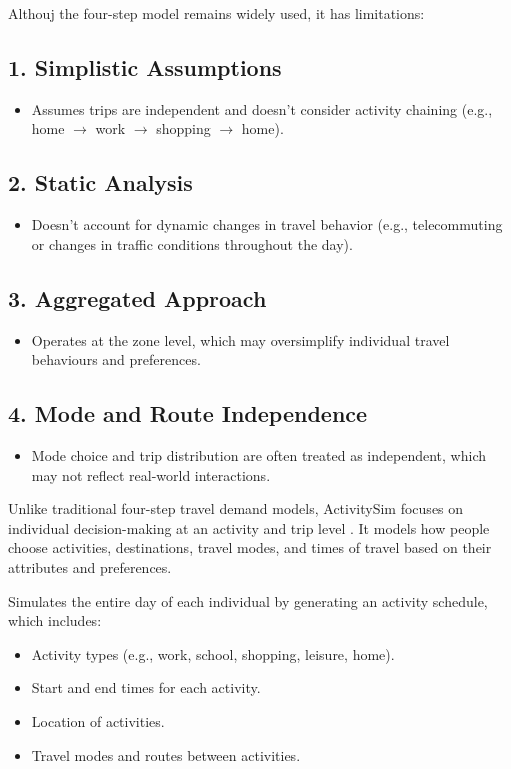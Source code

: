 \documentclass[../main.tex]{subfiles}
\begin{document}
Althouj the four-step model remains widely used, it has limitations:

\subsection*{1. Simplistic Assumptions}
\begin{itemize}
    \item Assumes trips are independent and doesn't consider activity chaining (e.g., home $\rightarrow$ work $\rightarrow$ shopping $\rightarrow$ home).
\end{itemize}

\subsection*{2. Static Analysis}
\begin{itemize}
    \item Doesn't account for dynamic changes in travel behavior (e.g., telecommuting or changes in traffic conditions throughout the day).
\end{itemize}

\subsection*{3. Aggregated Approach}
\begin{itemize}
    \item Operates at the zone level, which may oversimplify individual travel behaviours and preferences.
\end{itemize}

\subsection*{4. Mode and Route Independence}
\begin{itemize}
    \item Mode choice and trip distribution are often treated as independent, which may not reflect real-world interactions.
\end{itemize}

 Unlike traditional four-step travel demand models, ActivitySim focuses on individual decision-making at an activity and trip level \citep{GalliActivitySim:Simulation}.
It models how people choose activities, destinations, travel modes, and times of travel based on their attributes and preferences.

Simulates the entire day of each individual by generating an activity schedule, which includes:
\begin{itemize}
\item Activity types (e.g., work, school, shopping, leisure, home).
\item Start and end times for each activity.
\item Location of activities.
\item Travel modes and routes between activities.
\end{itemize}
\end{document}
